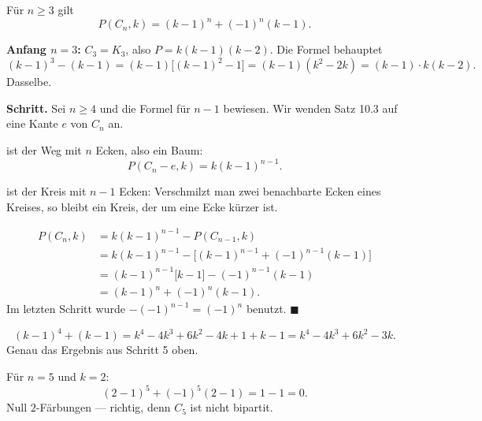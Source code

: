 \begin{merksatz}
Für $n \ge 3$ gilt
\[ P(C_n, k) = (k-1)^n + (-1)^n (k-1) . \]

\textbf{Anfang $n=3$:} $C_3 = K_3$, also $P = k(k-1)(k-2)$. Die Formel behauptet
\[ (k-1)^3 - (k-1) = (k-1)\bigl[(k-1)^2 - 1\bigr] = (k-1)(k^2-2k) = (k-1)\cdot k(k-2) . \]
Dasselbe. \checkmark

\textbf{Schritt.} Sei $n \ge 4$ und die Formel für $n-1$ bewiesen. Wir wenden Satz 10.3 auf eine Kante $e$ von $C_n$ an.

 ist der Weg mit $n$ Ecken, also ein Baum:
\[ P(C_n - e, k) = k(k-1)^{n-1} . \]

 ist der Kreis mit $n-1$ Ecken: Verschmilzt man zwei benachbarte Ecken eines Kreises, so bleibt ein Kreis, der um eine Ecke kürzer ist.

\begin{align*}
P(C_n,k) &= k(k-1)^{n-1} - P(C_{n-1},k)\\
&= k(k-1)^{n-1} - \bigl[(k-1)^{n-1} + (-1)^{n-1}(k-1)\bigr]\\
&= (k-1)^{n-1}\bigl[k - 1\bigr] - (-1)^{n-1}(k-1)\\
&= (k-1)^{n} + (-1)^{n}(k-1) .
\end{align*}
Im letzten Schritt wurde $-(-1)^{n-1} = (-1)^n$ benutzt. $\blacksquare$

\[ (k-1)^4 + (k-1) = k^4 - 4k^3 + 6k^2 - 4k + 1 + k - 1 = k^4 - 4k^3 + 6k^2 - 3k . \]
Genau das Ergebnis aus Schritt 5 oben. \checkmark

Für $n = 5$ und $k = 2$:
\[ (2-1)^5 + (-1)^5(2-1) = 1 - 1 = 0 . \]
Null $2$-Färbungen --- richtig, denn $C_5$ ist nicht bipartit. \checkmark
\end{merksatz}

